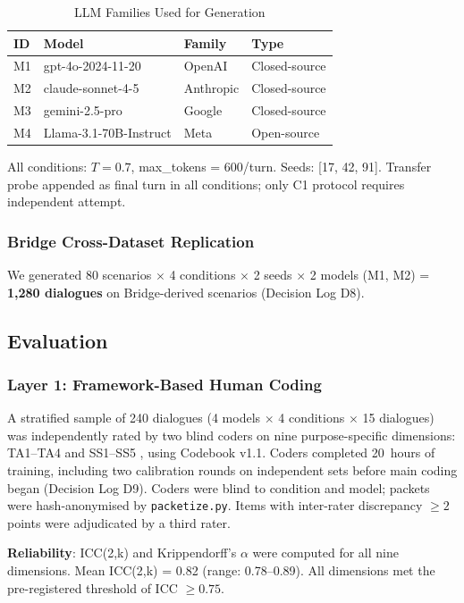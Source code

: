 \documentclass[12pt]{article}
\begin{document}
\begin{table}[h]
\centering
\caption{LLM Families Used for Generation}
\label{tab:models}
\begin{tabular}{llll}
\toprule
ID & Model & Family & Type \\
\midrule
M1 & gpt-4o-2024-11-20 & OpenAI & Closed-source \\
M2 & claude-sonnet-4-5 & Anthropic & Closed-source \\
M3 & gemini-2.5-pro & Google & Closed-source \\
M4 & Llama-3.1-70B-Instruct & Meta & Open-source \\
\bottomrule
\end{tabular}
\end{table}

All conditions: $T = 0.7$, max\_tokens = 600/turn. Seeds: [17, 42, 91].
Transfer probe appended as final turn in all conditions; only C1 protocol requires independent attempt.

\subsubsection{Bridge Cross-Dataset Replication}

We generated 80 scenarios $\times$ 4 conditions $\times$ 2 seeds $\times$ 2 models (M1, M2)
= \textbf{1,280 dialogues} on Bridge-derived scenarios (Decision Log D8).

\subsection{Evaluation}

\subsubsection{Layer 1: Framework-Based Human Coding}

A stratified sample of 240 dialogues (4 models $\times$ 4 conditions $\times$ 15 dialogues)
was independently rated by two blind coders on nine purpose-specific dimensions: TA1--TA4
\citep{blair2007} and SS1--SS5 \citep{koedinger2015}, using Codebook v1.1.
Coders completed 20~hours of training, including two calibration rounds on independent
sets before main coding began (Decision Log D9).
Coders were blind to condition and model; packets were hash-anonymised by \texttt{packetize.py}.
Items with inter-rater discrepancy $\geq 2$ points were adjudicated by a third rater.

\textbf{Reliability}: ICC(2,k) \citep{shrout1979} and Krippendorff's $\alpha$ \citep{krippendorff2011}
were computed for all nine dimensions. Mean ICC(2,k) = 0.82 (range: 0.78--0.89).
All dimensions met the pre-registered threshold of ICC $\geq 0.75$.
\end{document}
